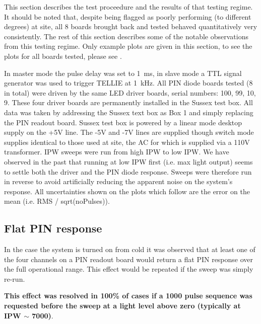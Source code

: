 \documentclass[12pt]{report}
\begin{document}
This section describes the test proceedure and the results of that testing regime. It should be noted that, despite being flagged as poorly performing (to different degrees) at site, all 8 boards brought back and tested behaved quantitatively very consistently. The rest of this section describes some of the notable observations from this testing regime. Only example plots are given in this section, to see the plots for all boards tested, please see \cite{telliePINeffects}. 

In master mode the pulse delay was set to 1~ms, in slave mode a TTL signal generator was used to trigger TELLIE at 1~kHz. All PIN diode boards tested (8 in total) were driven by the same LED driver boards, serial numbers: 100, 99, 10, 9. These four driver boards are permanently installed in the Sussex test box. All data was taken by addressing the Sussex text box as Box 1 and simply replacing the PIN readout board. Sussex test box is powered by a linear mode desktop supply on the +5V line. The -5V and -7V lines are supplied though switch mode supplies identical to those used at site, the AC for which is supplied via a 110V transformer. IPW sweeps were run from high IPW to low IPW. We have observed in the past that running at low IPW first (i.e. max light output) seems to settle both the driver and the PIN diode response. Sweeps were therefore run in reverse to avoid artificially reducing the apparent noise on the system’s response. All uncertainties shown on the plots which follow are the error on the mean (i.e. RMS / sqrt(noPulses)).

\subsection{Flat PIN response}
In the case the system is turned on from cold it was observed that at least one of the four channels on a PIN readout board would return a flat PIN response over the full operational range. This effect would be repeated if the sweep was simply re-run. 

\textbf{This effect was resolved in 100\% of cases if a 1000 pulse sequence was requested before the sweep at a light level above zero (typically at IPW $\sim$ 7000)}. 
\end{document}
